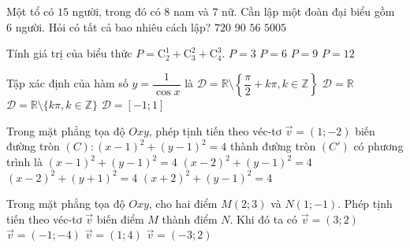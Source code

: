 \begin{ex}%
Một tổ có $15$ người, trong đó có $8$ nam và $7$ nữ. Cần lập một đoàn đại biểu gồm $6$ người. Hỏi có tất cả bao nhiêu cách lập?
\choice
{$720$}
{$90$}
{$56$}
{\True $5005$}
\end{ex}

\begin{ex}%
Tính giá trị của biểu thức $P= \mathrm{C}_2^1+\mathrm{C}_3^2+\mathrm{C}_4^3$.
\choice
{$P=3$}
{$P=6$}
{\True $P=9$}
{$P=12$}
\end{ex}

\begin{ex}%
Tập xác định của hàm số $y=\dfrac{1}{\cos x}$ là
\choice
	{\True $\mathscr{D} = \mathbb{R}\setminus \left\{\dfrac{\pi}{2}+k\pi, k\in \mathbb{Z}\right\}$}
    {$\mathscr{D} = \mathbb{R}$}
	{$\mathscr{D} = \mathbb{R}\setminus\{k\pi, k\in \mathbb{Z}\}$}
	{$\mathscr{D} = [-1;1]$}
\end{ex}

\begin{ex}%
Trong mặt phẳng tọa độ $Oxy$, phép tịnh tiến theo véc-tơ $\vec{v}=(1;-2)$ biến đường tròn $(C)\colon (x-1)^2+(y-1)^2 =4$ thành đường tròn $(C')$ có phương trình là
\choice
{$(x-1)^2+(y-1)^2 =4$}
{$(x-2)^2+(y-1)^2 =4$}
{\True $(x-2)^2+(y+1)^2 =4$}
{$(x+2)^2+(y-1)^2 =4$}
\end{ex}

\begin{ex}%
Trong mặt phẳng tọa độ $Oxy$, cho hai điểm $M(2;3)$ và $N(1;-1)$. Phép tịnh tiến theo véc-tơ $\overrightarrow{v}$ biến điểm $M$ thành điểm $N$. Khi đó ta có
\choice
{$\vec{v}=(3;2)$}
{\True $\vec{v}=(-1;-4)$}
{$\vec{v}=(1;4)$}
{$\vec{v}=(-3;2)$}
\end{ex}


